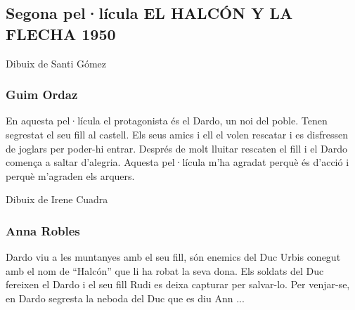 \begin{news}
\subsection*{Segona pel·lícula EL HALCÓN Y LA FLECHA 1950}
\noindent{}
Dibuix de Santi Gómez

\subsubsection*{
Guim Ordaz
}

En aquesta pel·lícula el protagonista és el Dardo, un noi del poble. Tenen segrestat el seu fill al castell. Els seus amics i ell el volen rescatar i es disfressen de joglars per poder-hi entrar. Després de molt lluitar rescaten el fill i el Dardo comença a saltar d’alegria.
Aquesta pel·lícula m’ha agradat perquè és d’acció i perquè m’agraden els arquers.


\noindent{}
Dibuix de Irene Cuadra

\subsubsection*
{Anna Robles}
Dardo viu a les muntanyes amb el seu fill, són enemics del Duc Urbis conegut amb el nom de “Halcón” que li ha robat la seva dona. Els soldats del Duc fereixen el Dardo  i el seu fill Rudi es deixa capturar per salvar-lo.
Per venjar-se, en Dardo segresta la neboda del Duc que es  diu Ann ...




\end{news}
